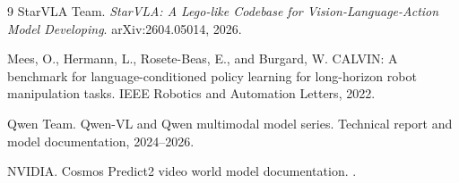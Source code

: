 \documentclass[10pt,a4paper,fontset=none]{ctexart}
\begin{document}
\begin{thebibliography}{9}
StarVLA Team.
\newblock \textit{StarVLA: A Lego-like Codebase for Vision-Language-Action Model Developing}.
\newblock arXiv:2604.05014, 2026.

Mees, O., Hermann, L., Rosete-Beas, E., and Burgard, W.
\newblock CALVIN: A benchmark for language-conditioned policy learning for long-horizon robot manipulation tasks.
\newblock IEEE Robotics and Automation Letters, 2022.

Qwen Team.
\newblock Qwen-VL and Qwen multimodal model series.
\newblock Technical report and model documentation, 2024--2026.

NVIDIA.
\newblock Cosmos Predict2 video world model documentation.
.
\end{thebibliography}
\end{document}
